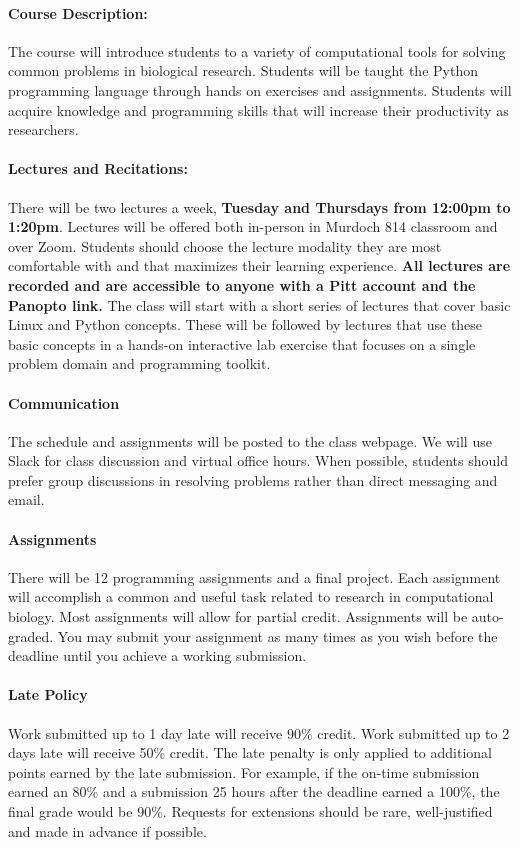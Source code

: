\documentclass[11pt,letterpaper,oneside]{article}
\begin{document}
\paragraph*{Course Description:}
The course will introduce students to a variety of computational tools for solving common problems in biological research. Students will be taught the Python programming language through hands on exercises and assignments. Students will acquire knowledge and programming skills that will increase their productivity as researchers.

\paragraph*{Lectures and Recitations:}  
There will be two lectures a week, \textbf{Tuesday and Thursdays from 12:00pm to 1:20pm}. Lectures will be offered both in-person in Murdoch 814 classroom and over Zoom.  Students should choose the lecture modality they are most comfortable with and that maximizes their learning experience. \textbf{All lectures are recorded and are accessible to anyone with a Pitt account and the Panopto link.} The class will start with a short series of lectures that cover basic Linux and Python concepts. These will be followed by lectures that use these basic concepts in a hands-on interactive lab exercise that focuses on a single problem domain and programming toolkit. 

\paragraph*{Communication}
The schedule and assignments will be posted to the class webpage. We will use Slack for class discussion and virtual office hours.  When possible, students should prefer group discussions in resolving problems rather than direct messaging and email.


\paragraph*{Assignments}  There will be 12 programming assignments and a final project. Each assignment will accomplish a common and useful task related to research in computational biology. Most assignments will allow for partial credit.  Assignments will be auto-graded.  
You may submit your assignment as many times as you wish before the deadline until you achieve a working submission.  

\paragraph*{Late Policy} Work submitted up to 1 day late will receive 90\% credit.  Work submitted up to 2 days late will receive 50\% credit.  The late penalty is only applied to additional points earned by the late submission.  For example, if the on-time submission earned an 80\% and a submission 25 hours after the deadline earned a 100\%, the final grade would be 90\%. Requests for extensions should be rare, well-justified and made in advance if possible.
\end{document}
